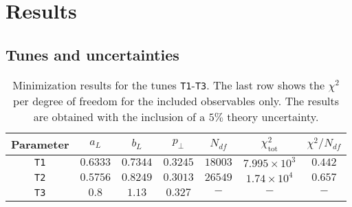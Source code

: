 \documentclass[aps,preprint,floatfix,nofootinbib,showpacs]{revtex4-1}
\begin{document}
\section{Results}
\label{Section4}

\subsection{Tunes and uncertainties}

\begin{table}[!h]
 \begin{center}
  \begin{tabular}{ c | c | c | c | c | c | c }
  \hline \hline
   Parameter   & \hspace{0.8cm} $a_L$  \hspace{0.8cm} & \hspace{0.8cm} $b_L$  \hspace{0.8cm} & \hspace{0.8cm} $p_\perp$ \hspace{0.8cm}  & \hspace{0.8cm} $N_{df}$ & $\chi^2_\textrm{tot}$ & $\chi^2/N_{df}$ \hspace{0.8cm} \\ \hline
   \texttt{T1} & $0.6333$      & $0.7344$  & $0.3245$  & $18003$ & $7.995 \times 10^3$ & $0.442$          \\ \hline
   \texttt{T2} & $0.5756$      & $0.8249$  & $0.3013$  &  $26549$ & $1.74 \times 10^4$  &  $0.657$     \\ \hline
   \texttt{T3} & $0.8$         & $1.13$    & $0.327$   & $-$ & $-$  & $-$          \\ \hline \hline
  \end{tabular}
 \end{center}
 \caption{Minimization results for the tunes \texttt{T1}-\texttt{T3}. 
 The last row shows the $\chi^2$ per degree of freedom for the included observables only. The results are obtained with the inclusion of a $5\%$ theory uncertainty.}
 \label{Table.tunes}
\end{table}
\end{document}
